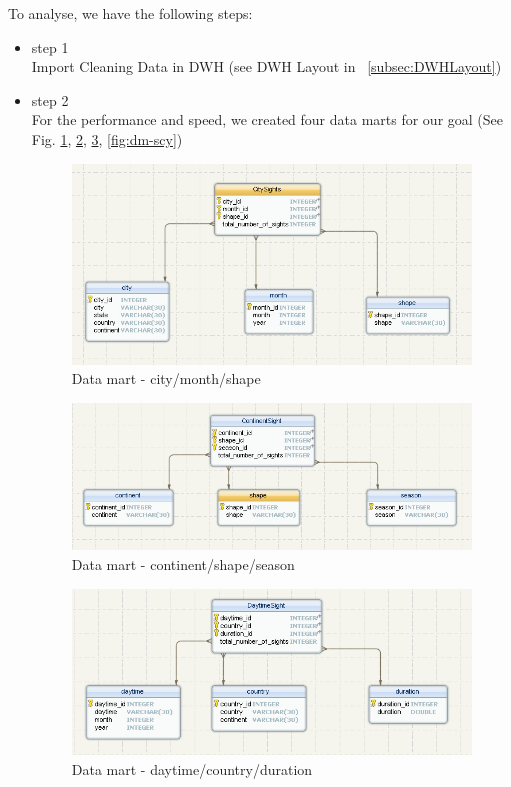 \documentclass[11pt, journal]{IEEEtran}
\begin{document}
To analyse, we have the following steps:
\begin{itemize}
    \item step 1\\
    Import Cleaning Data in DWH (see DWH Layout in ~\ref{subsec:DWHLayout})
    \item step 2\\
    For the performance and speed, we created four data marts for our goal (See Fig. \ref{fig:dm-cms}, \ref{fig:dm-css}, \ref{fig:dm-dcd}, \ref{fig:dm-scy})
      
    \begin{figure}[htb]
        \centering
            \includegraphics[width=1.0\columnwidth]{images/city-month-shape}
        \caption{Data mart - city/month/shape}
        \label{fig:dm-cms}
    \end{figure}

     \begin{figure}[htb]
            \centering
	            \includegraphics[width=1.0\columnwidth]{images/continent-shape-season}
            \caption{Data mart - continent/shape/season}
            \label{fig:dm-css}
        \end{figure}

     \begin{figure}[htb]
        \centering
            \includegraphics[width=1.0\columnwidth]{images/daytime-country-duration}
        \caption{Data mart - daytime/country/duration}
        \label{fig:dm-dcd}
    \end{figure}


\end{itemize}
\end{document}
